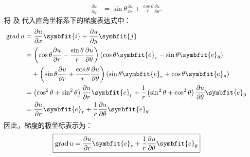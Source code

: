 \begin{solution}
\begin{equation}
\begin{aligned}
            \frac{\partial u}{\partial y} & = \sin\theta \frac{\partial u}{\partial r} + \frac{\cos\theta}{r} \frac{\partial u}{\partial \theta}.
        \end{aligned}
    \end{equation}
    将  及  代入直角坐标系下的梯度表达式中：
    \begin{equation}
        \label{eq:grad-substitution}
        \begin{aligned}
            \operatorname{grad} u & = \frac{\partial u}{\partial x} \symbfit{i} + \frac{\partial u}{\partial y} \symbfit{j}                                                                                                                 \\
                                  & = \left( \cos\theta \frac{\partial u}{\partial r} - \frac{\sin\theta}{r} \frac{\partial u}{\partial \theta} \right) \left( \cos\theta \symbfit{e}_r - \sin\theta \symbfit{e}_\theta \right)             \\
                                  & \quad + \left( \sin\theta \frac{\partial u}{\partial r} + \frac{\cos\theta}{r} \frac{\partial u}{\partial \theta} \right) \left( \sin\theta \symbfit{e}_r + \cos\theta \symbfit{e}_\theta \right)       \\
                                  & = \left( \cos^2\theta + \sin^2\theta \right) \frac{\partial u}{\partial r} \symbfit{e}_r + \frac{1}{r} \left( \sin^2\theta + \cos^2\theta \right) \frac{\partial u}{\partial \theta} \symbfit{e}_\theta \\
                                  & = \frac{\partial u}{\partial r} \symbfit{e}_r + \frac{1}{r} \frac{\partial u}{\partial \theta} \symbfit{e}_\theta.
        \end{aligned}
    \end{equation}
    因此，梯度的极坐标表示为：
    \begin{equation}
        \boxed{\operatorname{grad} u = \frac{\partial u}{\partial r} \symbfit{e}_r + \frac{1}{r} \frac{\partial u}{\partial \theta} \symbfit{e}_\theta}
    \end{equation}



\end{solution}
